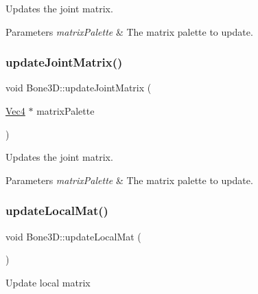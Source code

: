 Updates the joint matrix.


\begin{DoxyParams}{Parameters}
{\em matrix\+Palette} & The matrix palette to update. \\
\hline
\end{DoxyParams}
\mbox{\label{classBone3D_aab877746976dc466bcc339845529b2e5}} 
\subsubsection{\texorpdfstring{update\+Joint\+Matrix()}{updateJointMatrix()}\hspace{0.1cm}{\footnotesize\ttfamily [2/2]}}
{\footnotesize\ttfamily void Bone3\+D\+::update\+Joint\+Matrix (\begin{DoxyParamCaption}\item[{\hyperlink{classVec4}{Vec4} $\ast$}]{matrix\+Palette }\end{DoxyParamCaption})}

Updates the joint matrix.


\begin{DoxyParams}{Parameters}
{\em matrix\+Palette} & The matrix palette to update. \\
\hline
\end{DoxyParams}
\mbox{\label{classBone3D_a3e5720b8df7a2d25d3d21362177949f8}} 
\subsubsection{\texorpdfstring{update\+Local\+Mat()}{updateLocalMat()}\hspace{0.1cm}{\footnotesize\ttfamily [1/2]}}
{\footnotesize\ttfamily void Bone3\+D\+::update\+Local\+Mat (\begin{DoxyParamCaption}{ }\end{DoxyParamCaption})\hspace{0.3cm}{\ttfamily [protected]}}

Update local matrix \mbox{\label{classBone3D_a3e5720b8df7a2d25d3d21362177949f8}} 
